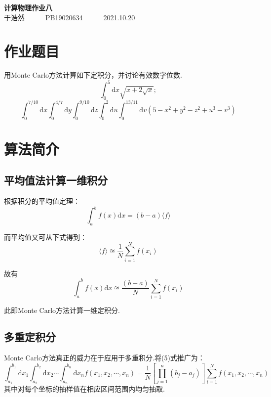 \documentclass[12pt,a4paper,utf8]{ctexart}
\begin{document}
\begin{center}
    {\LARGE\textbf{计算物理作业八}}\\
    \textrm{于浩然}~~~~~~\textrm{PB19020634}~~~~~~\textrm{2021.10.20}
\end{center}

\section{作业题目}

用Monte Carlo方法计算如下定积分，并讨论有效数字位数.
\begin{equation}
    \int _0 ^5 \textrm{d}x \sqrt{x+ 2 \sqrt{x}};
\end{equation}
\begin{equation}
    \int _0 ^{7/10} \textrm{d}x \int _0 ^{4/7} \textrm{d}y \int _0 ^{9/10}
    \textrm{d}z \int _0 ^2 \textrm{d} u \int _0 ^{13/11} \textrm{d} v (5 - x^2 +y^2 -
    z^2 + u^3 - v^3)
\end{equation}

\section{算法简介}

\subsection{平均值法计算一维积分}

根据积分的平均值定理：
\begin{equation}
    \int _{a} ^{b} f(x) \textrm{d}x = (b - a)\langle f \rangle
\end{equation}

而平均值又可从下式得到：
\begin{equation}
    \langle f \rangle \approxeq \frac{1}{N} \sum_{i=1}^{N}f(x_i)
\end{equation}

故有
\begin{equation}
    \int _{a} ^{b} f(x)	\textrm{d}x \approxeq \frac{(b-a)}{N} \sum_{i=1}^{N}
    f(x_i)
\end{equation}

此即Monte Carlo方法计算一维定积分.

\subsection{多重定积分}

Monte Carlo方法真正的威力在于应用于多重积分.将(5)式推广为：
\begin{equation}
    \int _{a_1} ^{b_1} \textrm{d} x_1	\int _{a_2} ^{b_2} \textrm{d}x_2	
    \cdots \int _{a_n} ^{b_n} \textrm{d}x_n	f(x_1,x_2,\cdots,x_n)
    = \frac{1}{N}\left[ \prod_{j=1}^{n} (b_j - a_j)\right]
    \sum_{i=1}^{N}f(x_1,x_2,\cdots,x_n)
\end{equation}
其中对每个坐标的抽样值在相应区间范围内均匀抽取.
\end{document}
